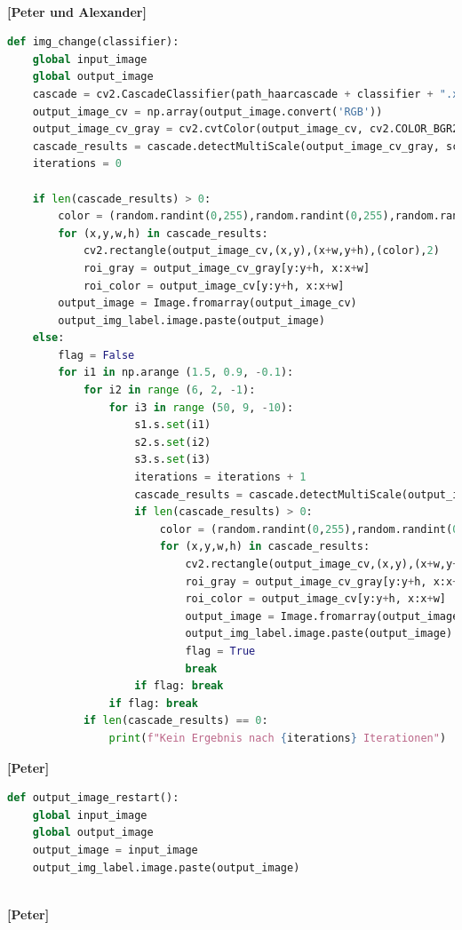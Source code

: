 \documentclass{article}
\begin{document}
\ \\
\textbf{[Peter und Alexander]}
\begin{lstlisting}[language=Python]
def img_change(classifier):
	global input_image
	global output_image
	cascade = cv2.CascadeClassifier(path_haarcascade + classifier + ".xml")
	output_image_cv = np.array(output_image.convert('RGB'))
	output_image_cv_gray = cv2.cvtColor(output_image_cv, cv2.COLOR_BGR2GRAY)
	cascade_results = cascade.detectMultiScale(output_image_cv_gray, scaleFactor=s1.get_val(), minNeighbors = s2.get_val(), minSize=(s3.get_val(), s3.get_val())) 
	iterations = 0

	if len(cascade_results) > 0:
		color = (random.randint(0,255),random.randint(0,255),random.randint(0,255))
		for (x,y,w,h) in cascade_results:
			cv2.rectangle(output_image_cv,(x,y),(x+w,y+h),(color),2)
			roi_gray = output_image_cv_gray[y:y+h, x:x+w]
			roi_color = output_image_cv[y:y+h, x:x+w]
		output_image = Image.fromarray(output_image_cv) 
		output_img_label.image.paste(output_image)
	else:
		flag = False
		for i1 in np.arange (1.5, 0.9, -0.1):
			for i2 in range (6, 2, -1):
				for i3 in range (50, 9, -10):                 
					s1.s.set(i1)
					s2.s.set(i2)
					s3.s.set(i3)
					iterations = iterations + 1
					cascade_results = cascade.detectMultiScale(output_image_cv_gray, scaleFactor=s1.get_val(), minNeighbors = s2.get_val(), minSize=(s3.get_val(), s3.get_val()))
					if len(cascade_results) > 0:
						color = (random.randint(0,255),random.randint(0,255),random.randint(0,255))
						for (x,y,w,h) in cascade_results:
							cv2.rectangle(output_image_cv,(x,y),(x+w,y+h),(color),2)
							roi_gray = output_image_cv_gray[y:y+h, x:x+w]
							roi_color = output_image_cv[y:y+h, x:x+w]
							output_image = Image.fromarray(output_image_cv)
							output_img_label.image.paste(output_image)
							flag = True
							break
					if flag: break
				if flag: break
			if len(cascade_results) == 0:
				print(f"Kein Ergebnis nach {iterations} Iterationen")          
\end{lstlisting}

\textbf{[Peter]}
\begin{lstlisting}[language=Python]
def output_image_restart():
	global input_image
	global output_image
	output_image = input_image
	output_img_label.image.paste(output_image)
\end{lstlisting}
\ \\ 
\textbf{[Peter]}
\end{document}
